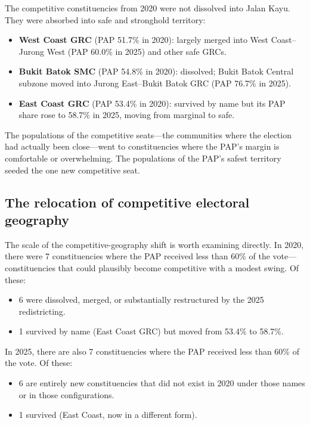 \documentclass[12pt]{article}
\begin{document}
The competitive constituencies from 2020 were not dissolved into Jalan Kayu. They were absorbed
into safe and stronghold territory:
%
\begin{itemize}\setlength\itemsep{0.2em}
  \item \textbf{West Coast GRC} (PAP 51.7\% in 2020): largely merged into West
    Coast--Jurong West (PAP 60.0\% in 2025) and other safe GRCs.
  \item \textbf{Bukit Batok SMC} (PAP 54.8\% in 2020): dissolved; Bukit Batok Central
    subzone moved into Jurong East--Bukit Batok GRC (PAP 76.7\% in 2025).
  \item \textbf{East Coast GRC} (PAP 53.4\% in 2020): survived by name but its PAP share
    rose to 58.7\% in 2025, moving from marginal to safe.
\end{itemize}
%
The populations of the competitive seats---the communities where the election had actually been
close---went to constituencies where the PAP's margin is comfortable or overwhelming. The
populations of the PAP's safest territory seeded the one new competitive seat.

\subsection{The relocation of competitive electoral geography}

The scale of the competitive-geography shift is worth examining directly. In 2020, there were 7
constituencies where the PAP received less than 60\% of the vote---constituencies that could
plausibly become competitive with a modest swing. Of these:

\begin{itemize}\setlength\itemsep{0.2em}
  \item 6 were dissolved, merged, or substantially restructured by the 2025 redistricting.
  \item 1 survived by name (East Coast GRC) but moved from 53.4\% to 58.7\%.
\end{itemize}

In 2025, there are also 7 constituencies where the PAP received less than 60\% of the vote. Of
these:

\begin{itemize}\setlength\itemsep{0.2em}
  \item 6 are entirely new constituencies that did not exist in 2020 under those names or in
    those configurations.
  \item 1 survived (East Coast, now in a different form).
\end{itemize}
\end{document}
